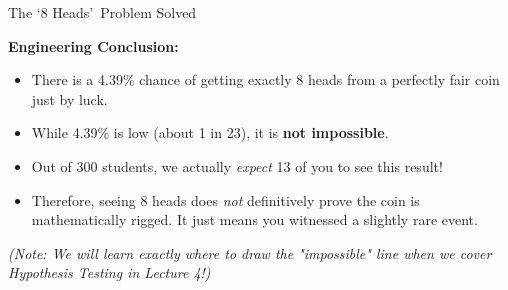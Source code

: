 \begin{frame}[allowframebreaks]{The \lq 8 Heads\rq\ Problem Solved}
    \begin{solution}
        \textbf{Engineering Conclusion:}
        \begin{itemize}
            \item There is a 4.39\% chance of getting exactly 8 heads from a perfectly fair coin just by luck.
            \item While 4.39\% is low (about 1 in 23), it is \textbf{not impossible}. 
            \item Out of 300 students, we actually \textit{expect} 13 of you to see this result!
            \item Therefore, seeing 8 heads does \textit{not} definitively prove the coin is mathematically rigged. It just means you witnessed a slightly rare event.
        \end{itemize}
        
        \vspace{0.4cm}
        \textit{(Note: We will learn exactly where to draw the "impossible" line when we cover Hypothesis Testing in Lecture 4!)}
    \end{solution}
\end{frame}


